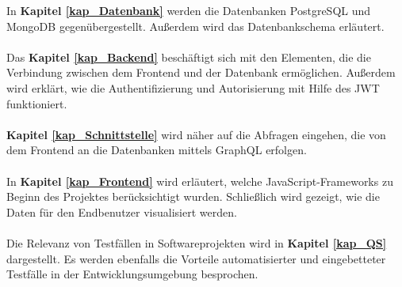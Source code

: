 In \textbf{Kapitel \ref{kap_Datenbank}} werden die Datenbanken PostgreSQL und MongoDB gegenübergestellt. Außerdem wird das Datenbankschema erläutert.
\\\\
Das \textbf{Kapitel \ref{kap_Backend}} beschäftigt sich mit den Elementen, die die Verbindung zwischen dem Frontend und der Datenbank ermöglichen. Außerdem wird erklärt, wie die Authentifizierung und Autorisierung mit Hilfe des JWT funktioniert.
\\\\
 \textbf{Kapitel \ref{kap_Schnittstelle}} wird näher auf die Abfragen eingehen, die von dem Frontend an die Datenbanken mittels GraphQL erfolgen.
\\\\
In \textbf{Kapitel \ref{kap_Frontend}} wird erläutert, welche JavaScript-Frameworks zu Beginn des Projektes berücksichtigt wurden. Schließlich wird gezeigt, wie die Daten für den Endbenutzer visualisiert werden.
\\\\
Die Relevanz von Testfällen in Softwareprojekten wird in \textbf{Kapitel \ref{kap_QS}} dargestellt. Es werden ebenfalls die Vorteile automatisierter und eingebetteter Testfälle in der Entwicklungsumgebung besprochen.

